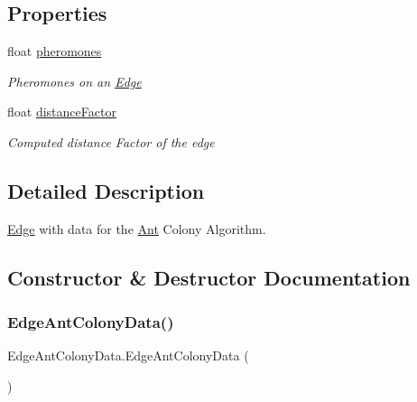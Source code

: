 \subsection*{Properties}
\begin{DoxyCompactItemize}
\item 
float \hyperlink{classEdgeAntColonyData_ac99dc0270bdca2f00d78cf58ba805211}{pheromones}
\begin{DoxyCompactList}\small\item\em Pheromones on an \hyperlink{classEdge}{Edge}\end{DoxyCompactList}\item 
float \hyperlink{classEdgeAntColonyData_a59a62ff81819e2be030da38ca02bb059}{distance\+Factor}
\begin{DoxyCompactList}\small\item\em Computed distance Factor of the edge\end{DoxyCompactList}\end{DoxyCompactItemize}


\subsection{Detailed Description}
\hyperlink{classEdge}{Edge} with data for the \hyperlink{classAnt}{Ant} Colony Algorithm. 



\subsection{Constructor \& Destructor Documentation}
\mbox{\label{classEdgeAntColonyData_a8a3218b8543d8d6c276e4930213ae2c1}} 
\subsubsection{\texorpdfstring{Edge\+Ant\+Colony\+Data()}{EdgeAntColonyData()}\hspace{0.1cm}{\footnotesize\ttfamily [1/3]}}
{\footnotesize\ttfamily Edge\+Ant\+Colony\+Data.\+Edge\+Ant\+Colony\+Data (\begin{DoxyParamCaption}{ }\end{DoxyParamCaption})\hspace{0.3cm}{\ttfamily [inline]}}



